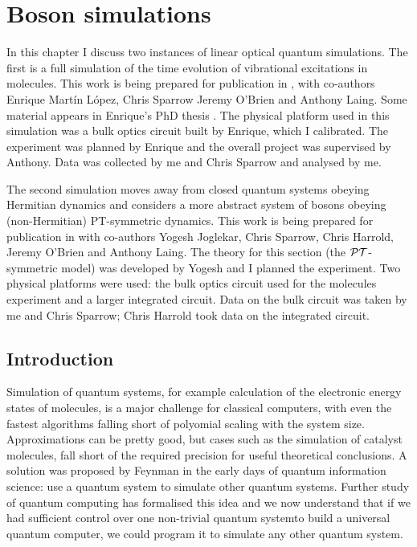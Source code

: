 \chapter{Boson simulations}
\label{ch:Simulations}
In this chapter I discuss two instances of linear optical quantum simulations.
The first is a full simulation of the time evolution of vibrational excitations
in molecules. This work is being prepared for publication in \cite{molecules},
with co-authors Enrique Mart\'in L\'opez, Chris Sparrow Jeremy O'Brien and
Anthony Laing. Some material appears in Enrique's PhD thesis \cite{enrique}. The
physical platform used in this simulation was a bulk optics circuit built by
Enrique, which I calibrated. The experiment was planned by Enrique and the
overall project was supervised by Anthony. Data was collected by me and Chris
Sparrow and analysed by me.

The second simulation moves away from closed quantum systems obeying Hermitian
dynamics and considers a more abstract system of bosons obeying (non-Hermitian) 
PT-symmetric dynamics. This work is being prepared for publication in
\cite{pt-prep} with co-authors Yogesh Joglekar, Chris Sparrow, Chris Harrold,
Jeremy O'Brien and Anthony Laing. The theory for this section (the
\(\mathcal{PT}\)-symmetric model) was developed by Yogesh and I planned the experiment.
Two physical platforms were used: the bulk optics circuit used for the molecules
experiment and a larger integrated circuit. Data on the bulk circuit was taken
by me and Chris Sparrow; Chris Harrold took data on the integrated circuit.

\section{Introduction}
\label{sec:SimIntro}
Simulation of quantum systems, for example calculation of the electronic energy
states of molecules,
is a major challenge for classical computers, with even the fastest algorithms
falling short of polyomial scaling with the system size. Approximations can be
pretty good, but cases such as the simulation of catalyst molecules, fall short
of the required precision for useful theoretical conclusions.  A solution
was proposed by Feynman \cite{qsim-feynman} in the early days of quantum
information science: use a quantum system to simulate other quantum systems.
Further study of quantum computing has formalised this idea and we now
understand that if we had sufficient control over one non-trivial quantum systemto build a universal quantum computer, we could program it to simulate any other
quantum system.

